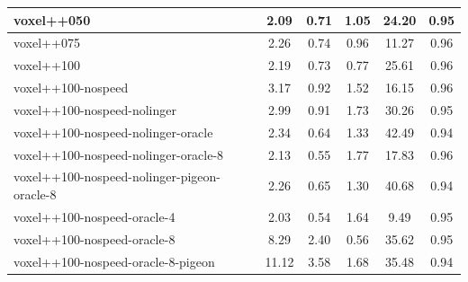 \begin{table}
\begin{longtable}{|l|c|c|c|c|c|}
voxel++050 & {\cellcolor[HTML]{DCEBE7}} \color[HTML]{000000} 2.09 & {\cellcolor[HTML]{EBF2F0}} \color[HTML]{000000} 0.71 & {\cellcolor[HTML]{EBF2F0}} \color[HTML]{000000} 1.05 & 24.20 & 0.95 \\ \hline
voxel++075 & {\cellcolor[HTML]{D9EAE6}} \color[HTML]{000000} 2.26 & {\cellcolor[HTML]{EBF2F0}} \color[HTML]{000000} 0.74 & {\cellcolor[HTML]{EBF2F0}} \color[HTML]{000000} 0.96 & 11.27 & 0.96 \\ \hline
voxel++100 & {\cellcolor[HTML]{DAEAE6}} \color[HTML]{000000} 2.19 & {\cellcolor[HTML]{EBF2F0}} \color[HTML]{000000} 0.73 & {\cellcolor[HTML]{EBF2F0}} \color[HTML]{000000} 0.77 & 25.61 & 0.96 \\ \hline
voxel++100-nospeed & {\cellcolor[HTML]{CBE3DE}} \color[HTML]{000000} 3.17 & {\cellcolor[HTML]{EBF2F0}} \color[HTML]{000000} 0.92 & {\cellcolor[HTML]{A7D1C9}} \color[HTML]{000000} 1.52 & 16.15 & 0.96 \\ \hline
voxel++100-nospeed-nolinger & {\cellcolor[HTML]{CEE4E0}} \color[HTML]{000000} 2.99 & {\cellcolor[HTML]{EBF2F0}} \color[HTML]{000000} 0.91 & {\cellcolor[HTML]{89C3B7}} \color[HTML]{000000} 1.73 & 30.26 & 0.95 \\ \hline
voxel++100-nospeed-nolinger-oracle & {\cellcolor[HTML]{D8E9E5}} \color[HTML]{000000} 2.34 & {\cellcolor[HTML]{EBF2F0}} \color[HTML]{000000} 0.64 & {\cellcolor[HTML]{C2DED8}} \color[HTML]{000000} 1.33 & 42.49 & 0.94 \\ \hline
voxel++100-nospeed-nolinger-oracle-8 & {\cellcolor[HTML]{DBEBE7}} \color[HTML]{000000} 2.13 & {\cellcolor[HTML]{EBF2F0}} \color[HTML]{000000} 0.55 & {\cellcolor[HTML]{83C0B4}} \color[HTML]{000000} 1.77 & 17.83 & 0.96 \\ \hline
voxel++100-nospeed-nolinger-pigeon-oracle-8 & {\cellcolor[HTML]{D9EAE6}} \color[HTML]{000000} 2.26 & {\cellcolor[HTML]{EBF2F0}} \color[HTML]{000000} 0.65 & {\cellcolor[HTML]{C7E1DB}} \color[HTML]{000000} 1.30 & 40.68 & 0.94 \\ \hline
voxel++100-nospeed-oracle-4 & {\cellcolor[HTML]{DCEBE8}} \color[HTML]{000000} 2.03 & {\cellcolor[HTML]{EBF2F0}} \color[HTML]{000000} 0.54 & {\cellcolor[HTML]{96C9BF}} \color[HTML]{000000} 1.64 & 9.49 & 0.95 \\ \hline
voxel++100-nospeed-oracle-8 & {\cellcolor[HTML]{7FBEB1}} \color[HTML]{000000} 8.29 & {\cellcolor[HTML]{9ACBC1}} \color[HTML]{000000} 2.40 & {\cellcolor[HTML]{EBF2F0}} \color[HTML]{000000} 0.56 & 35.62 & 0.95 \\ \hline
voxel++100-nospeed-oracle-8-pigeon & {\cellcolor[HTML]{55AA99}} \color[HTML]{F1F1F1} 11.12 & {\cellcolor[HTML]{55AA99}} \color[HTML]{F1F1F1} 3.58 & {\cellcolor[HTML]{90C7BC}} \color[HTML]{000000} 1.68 & 35.48 & 0.94 \\ \hline

\end{longtable}
\end{table}
